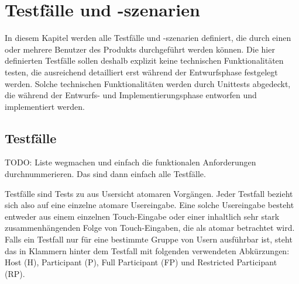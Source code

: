 \documentclass[oneside, ngerman]{sdqtechreport}
\begin{document}
\chapter{Testfälle und -szenarien}
\label{chap:Tests}

In diesem Kapitel werden alle Testfälle und -szenarien definiert, die durch einen oder mehrere Benutzer des Produkts durchgeführt werden können. Die hier definierten Testfälle sollen deshalb explizit keine technischen Funktionalitäten testen, die ausreichend detailliert erst während der Entwurfsphase festgelegt werden. Solche technischen Funktionalitäten werden durch Unittests abgedeckt, die während der Entwurfs- und Implementierungsphase entworfen und implementiert werden.

\section{Testfälle}
\label{sec:Tests:Testfälle}

TODO: Liste wegmachen und einfach die funktionalen Anforderungen durchnummerieren. Das sind dann einfach alle Testfälle.

Testfälle sind Tests zu aus Usersicht atomaren Vorgängen. Jeder Testfall bezieht sich also auf eine einzelne atomare Usereingabe. Eine solche Usereingabe besteht entweder aus einem einzelnen Touch-Eingabe oder einer inhaltlich sehr stark zusammenhängenden Folge von Touch-Eingaben, die als atomar betrachtet wird. Falls ein Testfall nur für eine bestimmte Gruppe von Usern ausführbar ist, steht das in Klammern hinter dem Testfall mit folgenden verwendeten Abkürzungen: Host (H), Participant (P), Full Participant (FP) und Restricted Participant (RP).
\end{document}
